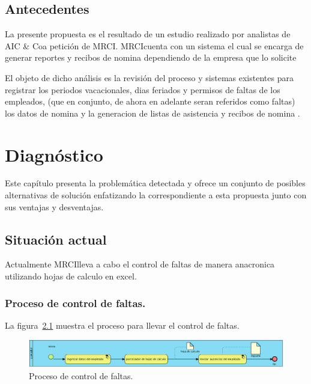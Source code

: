 \documentclass[10pt]{book}
\newcommand{\empresa}{AIC \& Co}
\newcommand{\cliente}{MRCI}
\begin{document}
	
\section{Antecedentes} 


	La presente propuesta es el resultado de un estudio realizado por analistas de \empresa a petición de \cliente.
	\cliente cuenta con un sistema el cual se encarga de generar reportes y recibos de nomina dependiendo de la empresa que lo solicite 
	
	El objeto de dicho análisis es la revisión del proceso y sistemas existentes para registrar los periodos vacacionales, dias feriados y permisos de faltas de los empleados, (que en conjunto, de ahora en adelante seran referidos como faltas) los datos de nomina y la generacion de listas de asistencia y recibos de nomina . 
	





\chapter{Diagnóstico} 

	Este capítulo presenta la problemática detectada y ofrece un conjunto de posibles alternativas de solución enfatizando la correspondiente a esta propuesta junto con sus ventajas y desventajas.
	
\section{Situación actual}

	Actualmente \cliente lleva a cabo el control de faltas de manera anacronica utilizando hojas de calculo en excel.
	
\subsection{Proceso de control de faltas.}

	La figura~\ref{fig:procesoLic} muestra el proceso para llevar el control de faltas.

\begin{figure}[htbp!]
	\begin{center}
		\includegraphics[width=\textwidth]{images/procesoLic}
		\caption{Proceso de control de faltas.}
		\label{fig:procesoLic}
	\end{center}
\end{figure}
\end{document}
